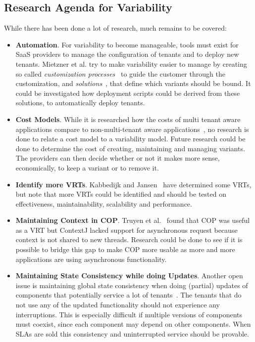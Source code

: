 \subsection{Research Agenda for Variability}\label{sec:var_agenda}
While there has been done a lot of research, much remains to be covered:
\begin{itemize}

\item \textbf{Automation}.
For variability to become manageable, tools must exist for \ac{SaaS} providers to manage the configuration of tenants and to deploy new tenants. Mietzner et al. try to make variability easier to manage by creating so called \textit{customization processes}~\cite{mietzner2008generation} to guide the customer through the customization, and \textit{solutions}~\cite{mietzner2008defining}, that define which variants should be bound. It could be investigated how deployment scripts could be derived from these solutions, to automatically deploy tenants.

\item \textbf{Cost Models}.
While it is researched how the costs of multi tenant aware applications compare to non-multi-tenant aware applications~\cite{mietzner2009variability}, no research is done to relate a cost model to a variability model. Future research could be done to determine the cost of creating, maintaining and managing variants. The providers can then decide whether or not it makes more sense, economically, to keep a variant or to remove it.

\item \textbf{Identify more \aclp{VRT}}. 
Kabbedijk and Jansen~\cite{kabbedijk2011variability} have determined some \acp{VRT}, but note that more \acp{VRT} could be identified and should be tested on effectiveness, maintainability, scalability and performance.

\item \textbf{Maintaining Context in \ac{COP}}. 
Truyen et al.~\cite{truyen2012context} found that \ac{COP} was useful as a \ac{VRT} but ContextJ lacked support for asynchronous request because context is not shared to new threads. Research could be done to see if it is possible to bridge this gap to make \ac{COP} more usable as more and more applications are using asynchronous functionality.

\item \textbf{Maintaining State Consistency while doing Updates}.
Another open issue is maintaining global state consistency when doing (partial) updates of components that potentially service a lot of tenants~\cite{truyen2012context,dumitracs2009upgrades}. The tenants that do not use any of the updated functionality should not experience any interruptions. This is especially difficult if multiple versions of components must coexist, since each component may depend on other components. When \acp{SLA} are sold this consistency and uninterrupted service should be provable.

\end{itemize}
